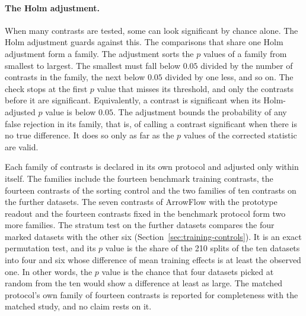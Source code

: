 \paragraph{The Holm adjustment.} When many contrasts are tested, some can look significant by chance alone. The Holm adjustment \citep{holm1979simple} guards against this. The comparisons that share one Holm adjustment form a family. The adjustment sorts the $p$ values of a family from smallest to largest. The smallest must fall below $0.05$ divided by the number of contrasts in the family, the next below $0.05$ divided by one less, and so on. The check stops at the first $p$ value that misses its threshold, and only the contrasts before it are significant. Equivalently, a contrast is significant when its Holm-adjusted $p$ value is below $0.05$. The adjustment bounds the probability of any false rejection in its family, that is, of calling a contrast significant when there is no true difference. It does so only as far as the $p$ values of the corrected statistic are valid.

Each family of contrasts is declared in its own protocol and adjusted only within itself. The families include the fourteen benchmark training contrasts, the fourteen contrasts of the sorting control and the two families of ten contrasts on the further datasets. The seven contrasts of ArrowFlow with the prototype readout and the fourteen contrasts fixed in the benchmark protocol form two more families. The stratum test on the further datasets compares the four marked datasets with the other six (Section~\ref{sec:training-controls}). It is an exact permutation test, and its $p$ value is the share of the 210 splits of the ten datasets into four and six whose difference of mean training effects is at least the observed one. In other words, the $p$ value is the chance that four datasets picked at random from the ten would show a difference at least as large. The matched protocol's own family of fourteen contrasts is reported for completeness with the matched study, and no claim rests on it.

